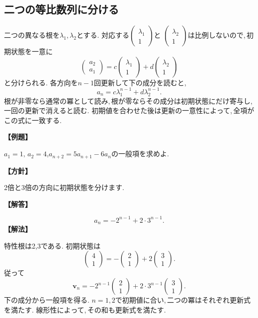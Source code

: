 \subsection{二つの等比数列に分ける}

二つの異なる根を$\lambda_1,\lambda_2$とする.
対応する$\begin{pmatrix}\lambda_1\\1\end{pmatrix}$と
$\begin{pmatrix}\lambda_2\\1\end{pmatrix}$は比例しないので,\,初期状態を一意に
\[
 \begin{pmatrix}a_2\\a_1\end{pmatrix}
 =c\begin{pmatrix}\lambda_1\\1\end{pmatrix}
 +d\begin{pmatrix}\lambda_2\\1\end{pmatrix}
\]
と分けられる.
各方向を$n-1$回更新して下の成分を読むと,
\[
 a_n=c\lambda_1^{n-1}+d\lambda_2^{n-1}.
\]
根が非零なら通常の冪として読み,\,根が零ならその成分は初期状態にだけ寄与し,\,一回の更新で消えると読む.
初期値を合わせた後は更新の一意性によって,\,全項がこの式に一致する.

\noindent\textbf{【例題】}\par\nobreak
$a_1=1,\,a_2=4$,$a_{n+2}=5a_{n+1}-6a_n$の一般項を求めよ.

\noindent\textbf{【方針】}\par\nobreak
2倍と3倍の方向に初期状態を分けます.

\noindent\textbf{【解答】}\par\nobreak
\[
 a_n=-2^{n-1}+2\cdot3^{n-1}.
\]
\noindent\textbf{【解法】}\par\nobreak
特性根は2,3である. 初期状態は
\[
 \begin{pmatrix}4\\1\end{pmatrix}
 =-\begin{pmatrix}2\\1\end{pmatrix}
 +2\begin{pmatrix}3\\1\end{pmatrix}.
\]
従って
\[
 \boldsymbol v_n
 =-2^{n-1}\begin{pmatrix}2\\1\end{pmatrix}
 +2\cdot3^{n-1}\begin{pmatrix}3\\1\end{pmatrix}.
\]
下の成分から一般項を得る.
$n=1,2$で初期値に合い,\,二つの冪はそれぞれ更新式を満たす.
線形性によって,\,その和も更新式を満たす.

